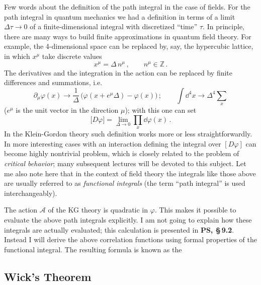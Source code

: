 Few words about the definition of the path integral in the case of fields. For
the path integral in quantum mechanics we had a definition in terms of a limit
$\Delta\tau\to0$ of a finite-dimensional integral with discretized ``time''
$\tau$. In principle, there are many ways to build finite approximations in
quantum field theory. For example, the 4-dimensional space can be replaced by,
say, the hypercubic lattice, in which $x^\mu$ take discrete values
\[
x^\mu=\Delta\,n^\mu\,,\qquad n^\mu\in\mathbb Z\,.
\]
The derivatives and the integration in the action can be replaced by finite
differences and summations, i.e.
\[
\partial_\mu\varphi(x)\to\frac1\Delta\,\bigl(\varphi(x+e^\mu\Delta)-\varphi(x)\bigr)\,;\qquad
\int \dd^4x\to\Delta^4\sum_x
\]
($e^\mu$ is the unit vector in the direction $\mu$); with this one can set
\begin{equation}\label{eq:latticemeasure}
\bigl[D\varphi\bigr]=\lim_{\Delta\to0}\prod_x\dd\varphi(x)\,.
\end{equation}
In the Klein-Gordon theory such definition works more or less
straightforwardly. In more interesting cases with an interaction defining the
integral over $[D\varphi]$ can become highly nontrivial problem, which is
closely related to the problem of \emph{critical behavior}; many subsequent
lectures will be devoted to this subject. Let me also note here that in the
context of field theory the integrals like those above are usually referred to
as \emph{functional integrals} (the term ``path integral'' is used
interchangeably).

The action $\mathcal A$ of the KG theory is quadratic in $\varphi$. This makes it
possible to evaluate the above path integrals explicitly. I am not going to
explain how these integrals are actually evaluated; this calculation is
presented in \textbf{PS, \S\,9.2}. Instead I will derive the above correlation
functions using formal properties of the functional integral. The resulting
formula is known as the

\subsection*{Wick's Theorem}

